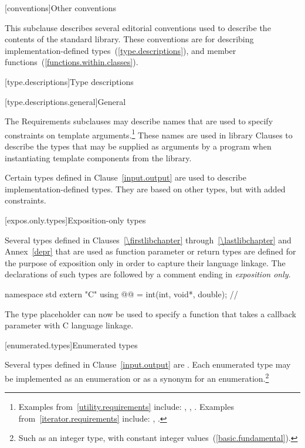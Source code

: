 [conventions]{Other conventions}
%

\pnum
This subclause describes several editorial conventions used to describe the contents
of the \Cpp standard library.
These conventions are for describing
implementation-defined types~(\ref{type.descriptions}),
and member functions~(\ref{functions.within.classes}).

[type.descriptions]{Type descriptions}

[type.descriptions.general]{General}

\pnum
The Requirements subclauses may describe names that are used to specify
constraints on template arguments.\footnote{Examples
from~\ref{utility.requirements} include:
,
,
.
Examples from~\ref{iterator.requirements} include:
,
.}
These names are used in library Clauses
to describe the types that
may be supplied as arguments by a \Cpp program when instantiating template components from
the library.

\pnum
Certain types defined in Clause~\ref{input.output} are used to describe implementation-defined types.
%
They are based on other types, but with added constraints.

[expos.only.types]{Exposition-only types}

\pnum
Several types defined in Clauses~\ref{\firstlibchapter} through~\ref{\lastlibchapter}
and Annex~\ref{depr} that are used as function parameter or return types are defined
for the purpose of exposition only in order to capture their language linkage. The
declarations of such types are followed by a comment ending in \textit{exposition only}.
\begin{example}
\begin{codeblock}
namespace std {
  extern "C" using @@ = int(int, void*, double);  // \expos
}
\end{codeblock}
The type placeholder  can now be used to specify a function
that takes a callback parameter with C language linkage.
\end{example}

[enumerated.types]{Enumerated types}

\pnum
Several types defined in Clause~\ref{input.output} are
.
%
Each enumerated type may be implemented as an enumeration or as a synonym for
an enumeration.\footnote{Such as an integer type, with constant integer
values~(\ref{basic.fundamental}).}


